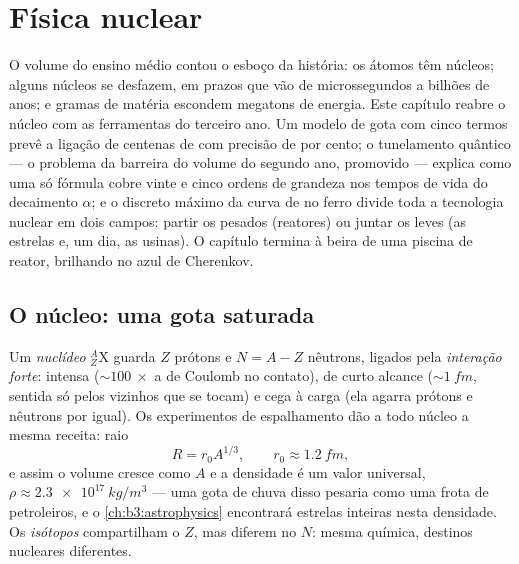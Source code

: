 \chapter{Física nuclear}\label{ch:b3:nuclear-physics}


O volume do ensino médio contou o esboço da história: os átomos têm
núcleos; alguns núcleos se desfazem, em prazos que vão de microssegundos
a bilhões de anos; e gramas de matéria escondem megatons de energia. Este
capítulo reabre o núcleo com as ferramentas do terceiro ano. Um modelo de
gota com cinco termos prevê a ligação de centenas de  com
precisão de por cento; o tunelamento quântico --- o problema da barreira
do volume do segundo ano, promovido --- explica como uma só fórmula cobre
vinte e cinco ordens de grandeza nos tempos de vida do decaimento
$\alpha$; e o discreto máximo da curva de  no ferro
divide toda a tecnologia nuclear em dois campos: partir os pesados
(reatores) ou juntar os leves (as estrelas e, um dia, as usinas). O
capítulo termina à beira de uma piscina de reator, brilhando no azul de
Cherenkov.

\section{O núcleo: uma gota saturada}

\begin{definition}\label{def:b3:nuclear-physics:nuclide}
Um \emph{nuclídeo} $^{A}_{Z}\text{X}$ guarda $Z$ prótons e $N = A -
Z$ nêutrons, ligados pela \emph{interação forte}: intensa
(${\sim}\qty{100}{}\times$ a de Coulomb no contato), de curto alcance
(${\sim}\qty{1}{fm}$, sentida só pelos vizinhos que se tocam) e cega
à carga (ela agarra prótons e nêutrons por igual). Os experimentos de
espalhamento dão a todo núcleo a mesma receita: raio
\[
R = r_0A^{1/3} , \qquad r_0 \approx \qty{1.2}{fm} ,
\]
e assim o volume cresce como $A$ e a densidade é um valor universal,
$\rho \approx \qty{2.3e17}{kg/m^3}$ --- uma gota de chuva disso pesaria
como uma frota de petroleiros, e o
\cref{ch:b3:astrophysics} encontrará estrelas inteiras nesta densidade.
Os \emph{isótopos} compartilham o $Z$, mas diferem no $N$: mesma química,
destinos nucleares diferentes.
\end{definition}

